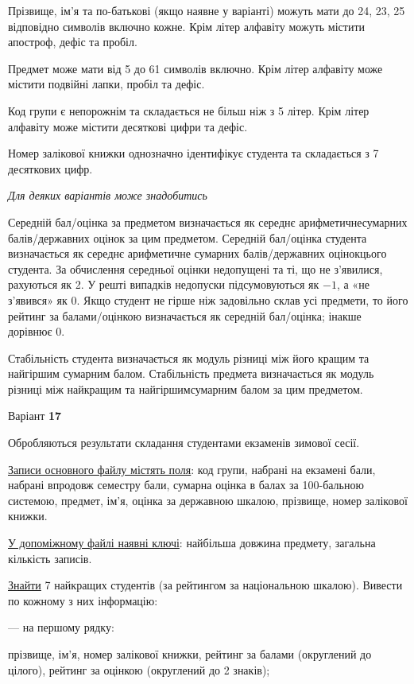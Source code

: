 \documentclass[11pt, ukrainian]{article}
\begin{document}
Прізвище, ім’я та по-батькові (якщо наявне у варіанті) можуть мати до 24, 23, 25 відповідно символів включно кожне. 
Крім літер алфавіту можуть містити апостроф, дефіс та пробіл.

Предмет може мати від 5 до 61 символів включно. 
Крім літер алфавіту може містити подвійні лапки, пробіл та дефіс.

Код групи є непорожнім та складається не більш ніж з 5 літер. 
Крім літер алфавіту може містити десяткові цифри та дефіс.


Номер залікової книжки однозначно ідентифікує студента та складається з 7 десяткових цифр. 

\bigskip\textit{Для деяких варіантів може знадобитись}

Середній бал/оцінка за предметом визначається як середнє арифметичнесумарних балів/державних оцінок за цим предметом. 
Середній бал/оцінка студента визначається як середнє арифметичне сумарних балів/державних оцінокцього студента. 
За обчислення середньої оцінки недопущені та ті, що не з’явилися, рахуються як 2.
У решті випадків недопуски підсумовуються як $-1$, а «не з’явився» як 0.
Якщо студент не гірше ніж задовільно склав усі предмети, 
то його рейтинг за балами/оцінкою визначається як середній бал/оцінка; інакше дорівнює 0.

Стабільність студента визначається як модуль різниці між його кращим та найгіршим сумарним балом.
Стабільність предмета визначається як модуль різниці між найкращим та найгіршимсумарним балом за цим предметом.




\par
\newpage
{\center Варіант  \No \textbf { 17 }\par}
\bigskip
Обробляються результати складання студентами екзаменів зимової сесії.

\underline{Записи основного файлу містять поля}: код групи, набрані на екзамені бали, набрані впродовж семестру бали, сумарна оцінка в балах за 100-бальною системою, предмет, ім’я, оцінка за державною шкалою, прізвище, номер залікової книжки.

\underline{У допоміжному файлі наявні ключі}: найбільша довжина предмету, загальна кількість записів.

\underline{Знайти} 7 найкращих студентів (за рейтингом за національною шкалою). Вивести по кожному з них інформацію:\par
{\noindent}--- на першому рядку:\par
прізвище, ім’я, номер залікової книжки, рейтинг за балами (округлений до цілого), рейтинг за оцінкою (округлений до 2 знаків);
\end{document}
